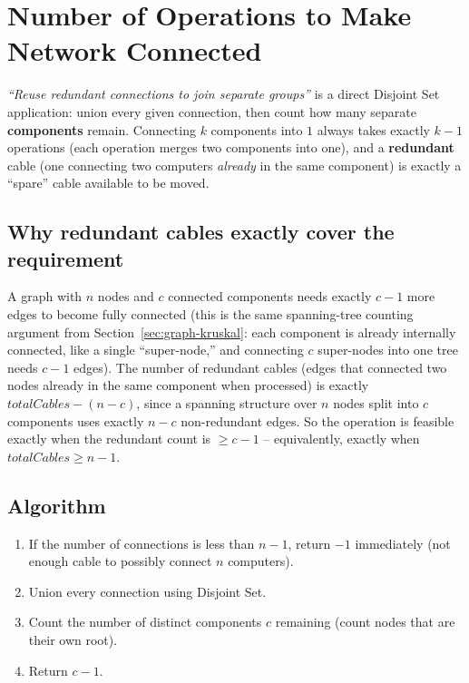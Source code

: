 \section{Number of Operations to Make Network Connected}
\label{sec:graph-network-connected}


\begin{patternbox}
\emph{``Reuse redundant connections to join separate groups''} is a
direct Disjoint Set application: union every given connection, then
count how many separate \textbf{components} remain. Connecting $k$
components into $1$ always takes exactly $k{-}1$ operations (each
operation merges two components into one), and a \textbf{redundant}
cable (one connecting two computers \emph{already} in the same
component) is exactly a ``spare'' cable available to be moved.
\end{patternbox}

\subsection*{Why redundant cables exactly cover the requirement}

A graph with $n$ nodes and $c$ connected components needs exactly
$c{-}1$ more edges to become fully connected (this is the same
spanning-tree counting argument from Section~\ref{sec:graph-kruskal}:
each component is already internally connected, like a single
``super-node,'' and connecting $c$ super-nodes into one tree needs
$c{-}1$ edges). The number of redundant cables (edges that connected
two nodes already in the same component when processed) is exactly
$\textit{totalCables} - (n - c)$, since a spanning structure over $n$
nodes split into $c$ components uses exactly $n-c$ non-redundant
edges. So the operation is feasible exactly when the redundant count
is $\ge c{-}1$ -- equivalently, exactly when $\textit{totalCables}
\ge n-1$.

\subsection*{Algorithm}

\begin{enumerate}
  \item If the number of connections is less than $n{-}1$, return
        $-1$ immediately (not enough cable to possibly connect $n$
        computers).
  \item Union every connection using Disjoint Set.
  \item Count the number of distinct components $c$ remaining (count
        nodes that are their own root).
  \item Return $c{-}1$.
\end{enumerate}

